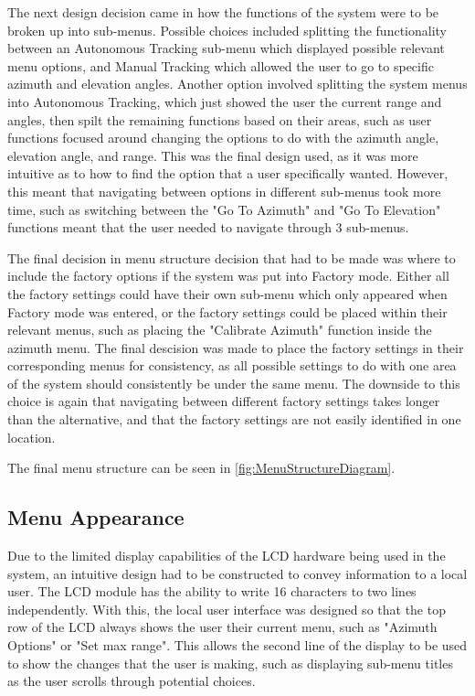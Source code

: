 \documentclass[]{report}
\begin{document}
The next design decision came in how the functions of the system were to be broken up into sub-menus. Possible choices included splitting the functionality between an Autonomous Tracking sub-menu which displayed possible relevant menu options, and Manual Tracking which allowed the user to go to specific azimuth and elevation angles. Another option involved splitting the system menus into Autonomous Tracking, which just showed the user the current range and angles, then spilt the remaining functions based on their areas, such as user functions focused around changing the options to do with the azimuth angle, elevation angle, and range. This was the final design used, as it was more intuitive as to how to find the option that a user specifically wanted. However, this meant that navigating between options in different sub-menus took more time, such as switching between the "Go To Azimuth" and "Go To Elevation" functions meant that the user needed to navigate through 3 sub-menus.


The final decision in menu structure decision that had to be made was where to include the factory options if the system was put into Factory mode. Either all the factory settings could have their own sub-menu which only appeared when Factory mode was entered, or the factory settings could be placed within their relevant menus, such as placing the "Calibrate Azimuth" function inside the azimuth menu. The final descision was made to place the factory settings in their corresponding menus for consistency, as all possible settings to do with one area of the system should consistently be under the same menu. The downside to this choice is again that navigating between different factory settings takes longer than the alternative, and that the factory settings are not easily identified in one location.


The final menu structure can be seen in \ref{fig:MenuStructureDiagram}.

\subsection{Menu Appearance}
Due to the limited display capabilities of the LCD hardware being used in the system, an intuitive design had to be constructed to convey information to a local user. The LCD module has the ability to write 16 characters to two lines independently. With this, the local user interface was designed so that the top row of the LCD always shows the user their current menu, such as "Azimuth Options" or "Set max range". This allows the second line of the display to be used to show the changes that the user is making, such as displaying sub-menu titles as the user scrolls through potential choices.
\end{document}
